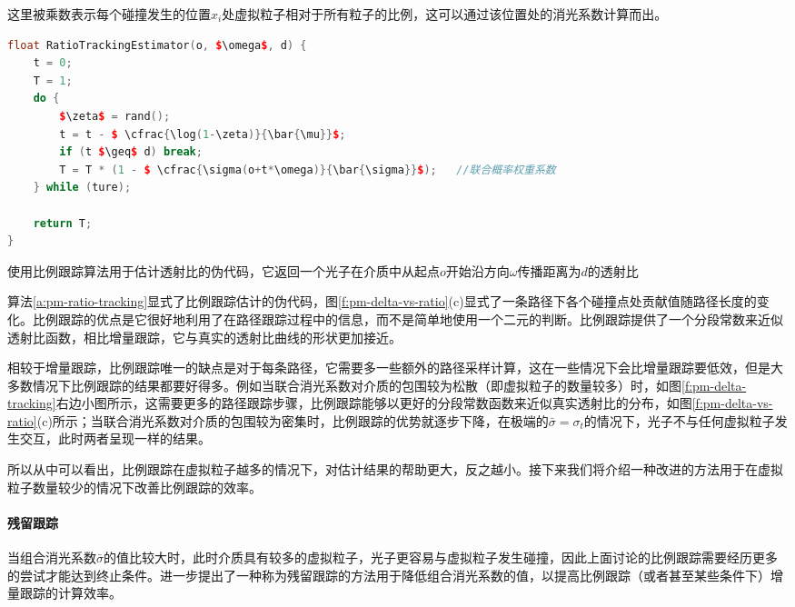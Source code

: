 这里被乘数表示每个碰撞发生的位置$x_i$处虚拟粒子相对于所有粒子的比例，这可以通过该位置处的消光系数计算而出。

\begin{algorithm}
\begin{lstlisting}[language=C++, mathescape]
float RatioTrackingEstimator(o, $\omega$, d) {
	t = 0;
	T = 1;
	do {
		$\zeta$ = rand();
		t = t - $ \cfrac{\log(1-\zeta)}{\bar{\mu}}$;
		if (t $\geq$ d) break;
		T = T * (1 - $ \cfrac{\sigma(o+t*\omega)}{\bar{\sigma}}$);   //联合概率权重系数
	} while (ture);
	
	return T;
}
\end{lstlisting}
\caption{使用比例跟踪算法用于估计透射比的伪代码，它返回一个光子在介质中从起点$o$开始沿方向$\omega$传播距离为$d$的透射比}
\label{a:pm-ratio-tracking}
\end{algorithm}

算法\ref{a:pm-ratio-tracking}显式了比例跟踪估计的伪代码，图\ref{f:pm-delta-vs-ratio}(c)显式了一条路径下各个碰撞点处贡献值随路径长度的变化。比例跟踪的优点是它很好地利用了在路径跟踪过程中的信息，而不是简单地使用一个二元的判断。比例跟踪提供了一个分段常数来近似透射比函数，相比增量跟踪，它与真实的透射比曲线的形状更加接近。

相较于增量跟踪，比例跟踪唯一的缺点是对于每条路径，它需要多一些额外的路径采样计算，这在一些情况下会比增量跟踪要低效，但是大多数情况下比例跟踪的结果都要好得多。例如当联合消光系数对介质的包围较为松散（即虚拟粒子的数量较多）时，如图\ref{f:pm-delta-tracking}右边小图所示，这需要更多的路径跟踪步骤，比例跟踪能够以更好的分段常数函数来近似真实透射比的分布，如图\ref{f:pm-delta-vs-ratio}(c)所示；当联合消光系数对介质的包围较为密集时，比例跟踪的优势就逐步下降，在极端的$\bar{\sigma}=\sigma_t$的情况下，光子不与任何虚拟粒子发生交互，此时两者呈现一样的结果。

所以从中可以看出，比例跟踪在虚拟粒子越多的情况下，对估计结果的帮助更大，反之越小。接下来我们将介绍一种改进的方法用于在虚拟粒子数量较少的情况下改善比例跟踪的效率。




\paragraph{残留跟踪}
当组合消光系数$\bar{\sigma}$的值比较大时，此时介质具有较多的虚拟粒子，光子更容易与虚拟粒子发生碰撞，因此上面讨论的比例跟踪需要经历更多的尝试才能达到终止条件。\cite{a:ResidualRatioTrackingforEstimatingAttenuationinParticipatingMedia}进一步提出了一种称为残留跟踪的方法用于降低组合消光系数的值，以提高比例跟踪（或者甚至某些条件下）增量跟踪的计算效率。

